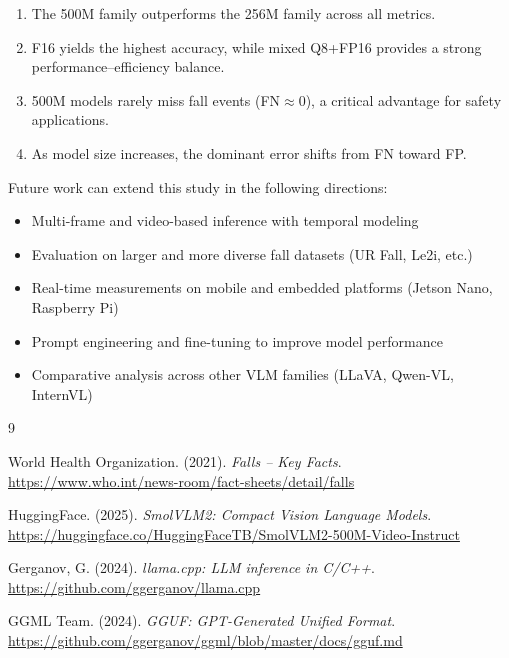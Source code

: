 \documentclass[12pt, a4paper]{article}
\begin{document}
\begin{enumerate}
    \item The 500M family outperforms the 256M family across all metrics.
    \item F16 yields the highest accuracy, while mixed Q8+FP16 provides a strong performance--efficiency balance.
    \item 500M models rarely miss fall events (FN$\approx$0), a critical advantage for safety applications.
    \item As model size increases, the dominant error shifts from FN toward FP.
\end{enumerate}

Future work can extend this study in the following directions:
\begin{itemize}
    \item Multi-frame and video-based inference with temporal modeling
    \item Evaluation on larger and more diverse fall datasets (UR Fall, Le2i, etc.)
    \item Real-time measurements on mobile and embedded platforms (Jetson Nano, Raspberry Pi)
    \item Prompt engineering and fine-tuning to improve model performance
    \item Comparative analysis across other VLM families (LLaVA, Qwen-VL, InternVL)
\end{itemize}

\begin{thebibliography}{9}

World Health Organization. (2021).
\textit{Falls -- Key Facts}.
\url{https://www.who.int/news-room/fact-sheets/detail/falls}

HuggingFace. (2025).
\textit{SmolVLM2: Compact Vision Language Models}.
\url{https://huggingface.co/HuggingFaceTB/SmolVLM2-500M-Video-Instruct}

Gerganov, G. (2024).
\textit{llama.cpp: LLM inference in C/C++}.
\url{https://github.com/ggerganov/llama.cpp}

GGML Team. (2024).
\textit{GGUF: GPT-Generated Unified Format}.
\url{https://github.com/ggerganov/ggml/blob/master/docs/gguf.md}

\end{thebibliography}
\end{document}
